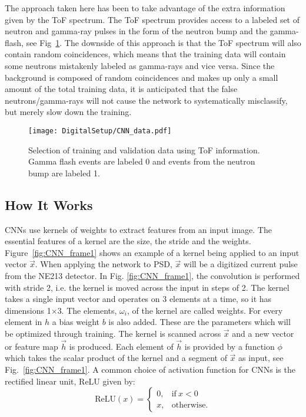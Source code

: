 \documentclass[main.tex]{subfiles}
\begin{document}
The approach taken here has been to take advantage of the extra information given by the ToF spectrum. The ToF spectrum provides access to a labeled set of neutron and gamma-ray pulses in the form of the neutron bump and the gamma-flash, see Fig~\ref{fig:CNN_data}. The downside of this approach is that the ToF spectrum will also contain random coincidences, which means that the training data will contain some neutrons mistakenly labeled as gamma-rays and vice versa. Since the background is composed of random coincidences and makes up only a small amount of the total training data, it is anticipated that the false neutrons/gamma-rays will not cause the network to systematically misclassify, but merely slow down the training.

\begin{figure}[h!]
    \centering
        \texttt{[image: DigitalSetup/CNN\_data.pdf]}
        \caption[Selection of training and validation data using ToF information.]{Selection of training and validation data using ToF information. Gamma flash events are labeled 0 and events from the neutron bump are labeled 1.}
    \label{fig:CNN_data} 
\end{figure}

\subsection{How It Works}
CNNs use kernels of weights to extract features from an input image. The essential features of a kernel are the size, the stride and the weights. Figure~\ref{fig:CNN_frame1} shows an example of a kernel being applied to an input vector $\vec{x}$. When applying the network to PSD, $\vec{x}$ will be a digitized current pulse from the NE213 detector. In Fig. \ref{fig:CNN_frame1}, the convolution is performed with stride 2, i.e. the kernel is moved across the input in steps of 2. 
The kernel takes a single input vector and operates on 3 elements at a time, so it has dimensions 1$\times$3. The elements, $\omega_i$, of the kernel are called weights. For every element in $h$ a bias weight $b$ is also added. These are the parameters which will be optimized through training. The kernel is scanned across $\vec{x}$ and a new vector or feature map $\vec{h}$ is produced. Each element of $\vec{h}$ is provided by a function $\phi$ which takes the scalar product of the kernel and a segment of $\vec{x}$ as input, see Fig.~\ref{fig:CNN_frame1}. 
A common choice of activation function for CNNs is the rectified linear unit, ReLU given by:
\begin{equation}
	\textrm{ReLU}(x) = 
	\begin{cases}
    	0, & \text{if}\ x<0 \\
    	x, & \text{otherwise}.
    \end{cases}
\end{equation}
\end{document}
